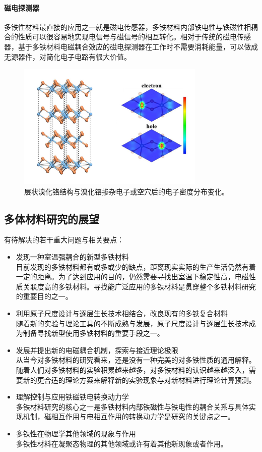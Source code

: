 \paragraph{磁电探测器}
多铁性材料最直接的应用之一就是磁电传感器，多铁材料内部铁电性与铁磁性相耦合的性质可以很容易地实现电信号与磁信号的相互转化。相对于传统的磁电传感器，基于多铁材料电磁耦合效应的磁电探测器在工作时不需要消耗能量，可以做成无源器件，对简化电子电路有很大价值。
\begin{figure}[h]
    \centering
\includegraphics[width=0.8\textwidth]{./pic/010-4.png}
\caption{层状溴化铬结构与溴化铬掺杂电子或空穴后的电子密度分布变化。}

\label{dog010-4}
\end{figure}


\subsection{多体材料研究的展望}

有待解决的若干重大问题与相关要点：
\begin{itemize}
    \item 发现一种室温强耦合的新型多铁材料\\
目前发现的多铁材料都有或多或少的缺点，距离现实实际的生产生活仍然有着一定的距离。为了达到应用的目的，仍然需要寻找出室温下稳定性高，电磁性质关联度高的多铁材料。寻找能广泛应用的多铁材料是贯穿整个多铁材料研究的重要目的之一。
    \item 利用原子尺度设计与逐层生长技术相结合，改良现有的多铁复合材料\\
随着新的实验与理论工具的不断成熟与发展，原子尺度设计与逐层生长技术成为制备寻找新型使用多铁材料的重要手段之一。
    \item 发展并提出新的电磁耦合机制，探索与接近理论极限 \\
从当今对多铁材料的研究看来，还是没有一种完美的对多铁性质的通用解释。随着人们对多铁材料的实验积累越来越多，对多铁材料的认识越来越深入，需要新的更合适的理论方案来解释新的实验现象与对新材料进行理论计算预测。
    \item 理解控制与应用铁磁铁电转换动力学\\
多铁材料研究的核心之一是多铁材料内部铁磁性与铁电性的耦合关系与具体实现机制，磁相互作用与电相互作用的转换动力学是研究的关键点之一。
    \item 多铁性在物理学其他领域的现象与作用\\
多铁性材料在凝聚态物理的其他领域或许有着其他新现象或者作用。
\end{itemize}

